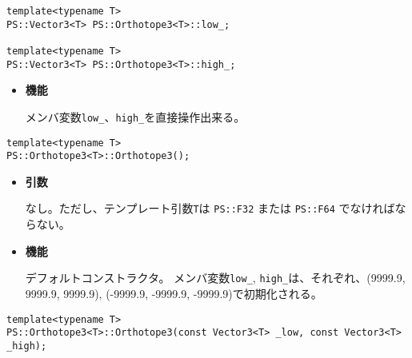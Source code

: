
\begin{screen}
\begin{verbatim}
template<typename T>
PS::Vector3<T> PS::Orthotope3<T>::low_;

template<typename T>
PS::Vector3<T> PS::Orthotope3<T>::high_;
\end{verbatim}
\end{screen}

\begin{itemize}
  
\item{{\bf 機能}}
  
メンバ変数\texttt{low\_}、\texttt{high\_}を直接操作出来る。
  
\end{itemize}


\begin{screen}
\begin{verbatim}
template<typename T>
PS::Orthotope3<T>::Orthotope3();
\end{verbatim}
\end{screen}

\begin{itemize}

\item{{\bf 引数}}

なし。ただし、テンプレート引数\texttt{T}は \texttt{PS::F32} または \texttt{PS::F64} でなければならない。

\item{{\bf 機能}}

デフォルトコンストラクタ。
メンバ変数\texttt{low\_}, \texttt{high\_}は、それぞれ、(9999.9, 9999.9, 9999.9), (-9999.9, -9999.9, -9999.9)で初期化される。

\end{itemize}
\begin{screen}
\begin{verbatim}
template<typename T>
PS::Orthotope3<T>::Orthotope3(const Vector3<T> _low, const Vector3<T> _high);
\end{verbatim}
\end{screen}

